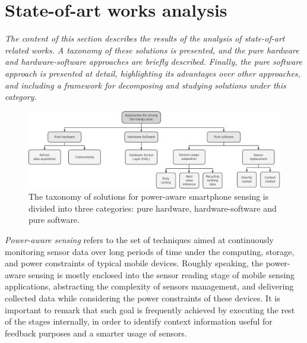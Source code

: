 \documentclass[ENG,PhD]{cinvestav}
\begin{document}
\section{State-of-art works analysis}
\label{sec:state-of-art}
\emph{The content of this section describes the results of the analysis of state-of-art related works. A taxonomy of these solutions is presented, and the pure hardware and hardware-software approaches are briefly described. Finally, the pure software approach is presented at detail, highlighting its advantages over other approaches, and including a framework for decomposing and studying solutions under this category.}


\begin{figure}[t]
  \centering
  \includegraphics[width=\textwidth]{approaches-taxonomy}
  \caption{The taxonomy of solutions for power-aware smartphone sensing is divided into three categories: pure hardware, hardware-software and pure software.}
  \label{fig:taxonomy-approaches}
\end{figure}

\emph{Power-aware sensing} refers to the set of techniques aimed at continuously monitoring sensor data over long periods of time under the computing, storage, and power constraints of typical mobile devices.
Roughly speaking, the power-aware sensing is mostly enclosed into the sensor reading stage of mobile sensing applications, abstracting the complexity of sensors management, and delivering collected data while considering the power constraints of these devices. 
It is important to remark that such goal is frequently achieved by executing the rest of the stages internally, in order to identify context information useful for feedback purposes and a smarter usage of sensors.
\end{document}
